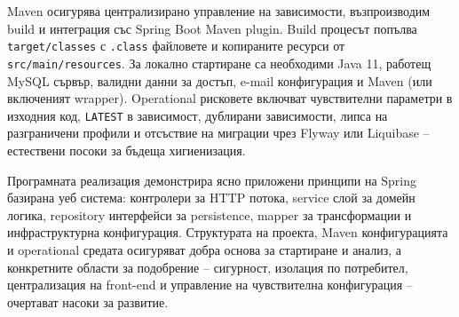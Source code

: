 Maven \cite{maven} осигурява централизирано управление на зависимости, възпроизводим build и интеграция със Spring Boot Maven plugin. Build процесът попълва \texttt{target/classes} с \texttt{.class} файловете и копираните ресурси от \texttt{src/main/resources}. За локално стартиране са необходими Java 11, работещ MySQL сървър, валидни данни за достъп, e-mail конфигурация и Maven (или включеният wrapper). Operational рисковете включват чувствителни параметри в изходния код, \texttt{LATEST} в зависимост, дублирани зависимости, липса на разграничени профили и отсъствие на миграции чрез Flyway или Liquibase -- естествени посоки за бъдеща хигиенизация.

Програмната реализация демонстрира ясно приложени принципи на Spring базирана уеб система: контролери за HTTP потока, service слой за домейн логика, repository интерфейси за persistence, mapper за трансформации и инфраструктурна конфигурация. Структурата на проекта, Maven конфигурацията и operational средата осигуряват добра основа за стартиране и анализ, а конкретните области за подобрение -- сигурност, изолация по потребител, централизация на front-end и управление на чувствителна конфигурация -- очертават насоки за развитие.
